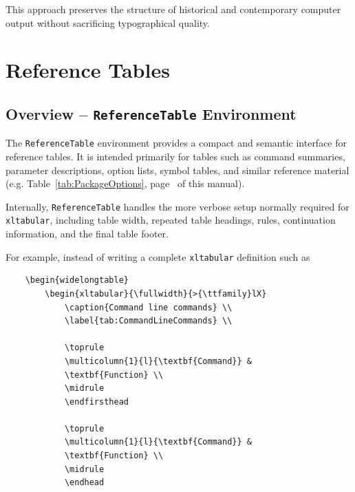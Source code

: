 \documentclass[
11pt,
a4paper,
oneside
]{scrbook}
\begin{document}
{This approach preserves the structure of historical and contemporary
computer output without sacrificing typographical quality. 

\chapter{Reference Tables}
\label{chap:ReferenceTables}
\begin{center}
	\vspace{-10ex}
\end{center}
\section{Overview -- \texttt{ReferenceTable} Environment}

The \texttt{ReferenceTable} environment provides a compact and semantic
interface for reference tables. It is intended primarily for tables such as
command summaries, parameter descriptions, option lists, symbol tables, and
similar reference material (e.g. Table~\ref{tab:PackageOptions}, 
page~\pageref{tab:PackageOptions} of this manual).

Internally, \texttt{ReferenceTable} handles the more verbose setup normally
required for \texttt{xltabular}, including table width, repeated table
headings, rules, continuation information, and the final table footer.

For example, instead of writing a complete \texttt{xltabular} definition such
as

\begin{verbatim}
	\begin{widelongtable}
		\begin{xltabular}{\fullwidth}{>{\ttfamily}lX}
			\caption{Command line commands} \\
			\label{tab:CommandLineCommands} \\
			
			\toprule
			\multicolumn{1}{l}{\textbf{Command}} &
			\textbf{Function} \\
			\midrule
			\endfirsthead
			
			\toprule
			\multicolumn{1}{l}{\textbf{Command}} &
			\textbf{Function} \\
			\midrule
			\endhead
			

\end{verbatim}}
\end{document}
